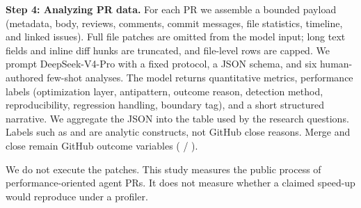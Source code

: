 {\textbf{Step 4: Analyzing PR data.}}
\label{analyze}
For each PR we assemble a bounded payload (metadata, body, reviews, comments, commit messages, file statistics, timeline, and linked issues). Full file patches are omitted from the model input; long text fields and inline diff hunks are truncated, and file-level rows are capped. We prompt DeepSeek-V4-Pro with a fixed protocol, a JSON schema, and six human-authored few-shot analyses. The model returns quantitative metrics, performance labels (optimization layer, antipattern, outcome reason, detection method, reproducibility, regression handling, boundary tag), and a short structured narrative. We aggregate the JSON into the table used by the research questions. Labels such as  and  are analytic constructs, not GitHub close reasons. Merge and close remain GitHub outcome variables ( / ).

We do not execute the patches. This study measures the public process of performance-oriented agent PRs. It does not measure whether a claimed speed-up would reproduce under a profiler.
